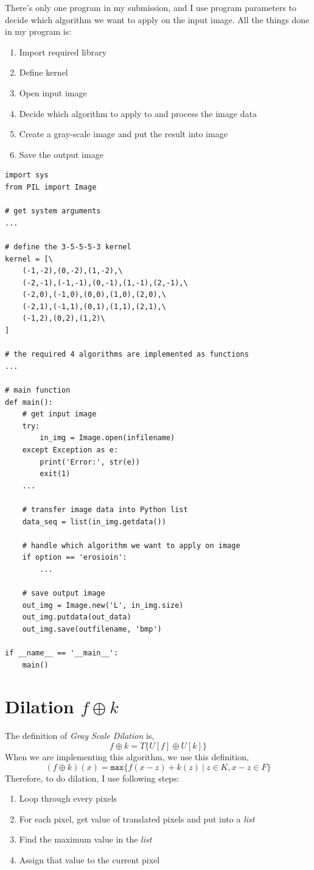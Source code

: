 \documentclass[14pt,a4paper]{extarticle}
\begin{document}
There's only one program in my submission, and I use program parameters to decide which algorithm we want to apply on the input image. All the things done in my program is:
\begin{enumerate}
	\item Import required library
	\item Define kernel
	\item Open input image
	\item Decide which algorithm to apply to and process the image data
	\item Create a gray-scale image and put the result into image
	\item Save the output image
\end{enumerate}

\begin{lstlisting}
import sys
from PIL import Image

# get system arguments
...

# define the 3-5-5-5-3 kernel
kernel = [\
    (-1,-2),(0,-2),(1,-2),\
    (-2,-1),(-1,-1),(0,-1),(1,-1),(2,-1),\
    (-2,0),(-1,0),(0,0),(1,0),(2,0),\
    (-2,1),(-1,1),(0,1),(1,1),(2,1),\
    (-1,2),(0,2),(1,2)\
]

# the required 4 algorithms are implemented as functions
...

# main function
def main():
    # get input image
    try:
        in_img = Image.open(infilename)
    except Exception as e:
        print('Error:', str(e))
        exit(1)
    ...

    # transfer image data into Python list
    data_seq = list(in_img.getdata())

    # handle which algorithm we want to apply on image
    if option == 'erosioin':
    	...

    # save output image
    out_img = Image.new('L', in_img.size)
    out_img.putdata(out_data)
    out_img.save(outfilename, 'bmp')

if __name__ == '__main__':
    main()
\end{lstlisting}

\section{Dilation $f \oplus k$}

The definition of \textit{Gray Scale Dilation} is,
\[ f \oplus k = T\{U[f] \oplus U[k] \} \]
When we are implementing this algorithm, we use this definition,
\[ (f \oplus k)(x) = \texttt{max}\{ f(x-z) + k(z)\ |\ z \in K, x-z \in F \} \]
Therefore, to do dilation, I use following steps:
\begin{enumerate}
	\item Loop through every pixels
	\item For each pixel, get value of translated pixels and put into a \textit{list}
	\item Find the maximum value in the \textit{list}
	\item Assign that value to the current pixel
\end{enumerate}
\end{document}
